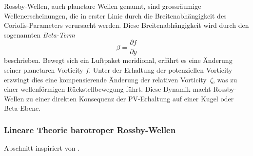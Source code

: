 
Rossby-Wellen, auch planetare Wellen genannt, sind grossräumige Wellenerscheinungen, die in erster Linie durch die Breitenabhängigkeit des Coriolis-Parameters verursacht werden. Diese Breitenabhängigkeit wird durch den sogenannten \emph{Beta-Term}
\begin{equation}
	\beta = \frac{\partial f}{\partial y}
	\label{eq:beta_term}
\end{equation}
beschrieben. Bewegt sich ein Luftpaket meridional, erfährt es eine Änderung seiner planetaren Vorticity \(f\). Unter der Erhaltung der potenziellen Vorticity erzwingt dies eine kompensierende Änderung der relativen Vorticity~\(\zeta\), was zu einer wellenförmigen Rückstellbewegung führt. Diese Dynamik macht Rossby-Wellen zu einer direkten Konsequenz der PV-Erhaltung auf einer Kugel oder Beta-Ebene.

\subsubsection{Lineare Theorie barotroper Rossby-Wellen}

Abschnitt inspiriert von \cite{rossby:mueller2018}.

